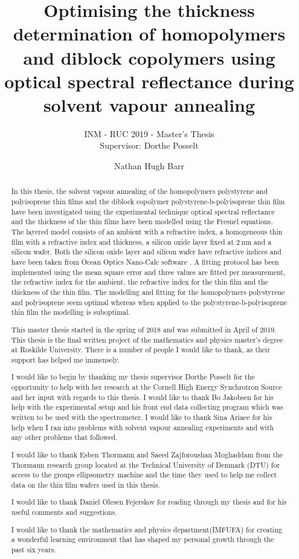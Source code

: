 \documentclass[12pt,a4paper]{report}
\author{Nathan Hugh Barr}
\title{Optimising the thickness determination of homopolymers and diblock copolymers using optical spectral reflectance during solvent vapour annealing}
\subtitle{INM - RUC 2019 - Master's Thesis \\ Supervisor: Dorthe Posselt}
\begin{document}
\maketitle

\begin{abstract}

In this thesis, the solvent vapour annealing of the homopolymers polystyrene and polyisoprene thin films and the diblock copolymer polystyrene-b-polyisoprene thin film have been investigated using the experimental technique optical spectral reflectance and the thickness of the thin films have been modelled using the Fresnel equations. The layered model consists of an ambient with a refractive index, a homogeneous thin film with a refractive index and thickness, a silicon oxide layer fixed at $\SI{2}{\nano\meter}$ and a silicon wafer. Both the silicon oxide layer and silicon wafer have refractive indices and have been taken from Ocean Optics Nano-Calc software \cite{nanocalcmanual}.  A fitting protocol has been implemented using the mean square error and three values are fitted per measurement, the refractive index for the ambient, the refractive index for the thin film and the thickness of the thin film. The modelling and fitting for the homopolymers polystyrene and polyisoprene seem optimal whereas when applied to the polystyrene-b-polyisoprene thin film the modelling is suboptimal.  

\end{abstract}

\renewcommand{\abstractname}{Acknowledgements}
\begin{abstract}
This master thesis started in the spring of 2018 and was submitted in April of 2019. This thesis is the final written project of the mathematics and physics master's degree at Roskilde University. There is a number of people I would like to thank, as their support has helped me immensely.

I would like to begin by thanking my thesis supervisor Dorthe Posselt for the opportunity to help with her research at the Cornell High Energy Synchrotron Source and her input with regards to this thesis. I would like to thank Bo Jakobsen for his help with the experimental setup and his front end data collecting program which was written to be used with the spectrometer. I would like to thank Sina Ariaee for his help when I ran into problems with solvent vapour annealing experiments and with any other problems that followed.

I would like to thank Esben Thormann and Saeed Zajforoushan Moghaddam from the Thormann research group located at the Technical University of Denmark (DTU) for access to the groups ellipsometry machine and the time they used to help me collect data on the thin film wafers used in this thesis.

I would like to thank Daniel Olesen Fejerskov for reading through my thesis and for his useful comments and suggestions.

I would like to thank the mathematics and physics department(IMFUFA) for creating a wonderful learning environment that has shaped my personal growth through the past six years.     

\end{abstract}
\end{document}
